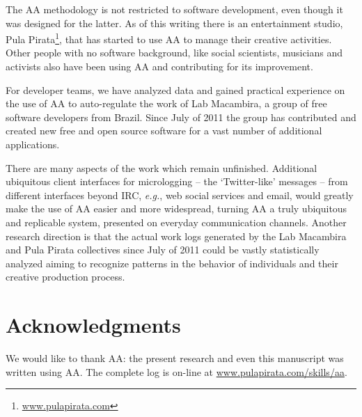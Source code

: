 \documentclass{article}
\newcommand{\eg}{{\it e.g.}}
\begin{document}
The AA methodology is not restricted to software development, even though it was
designed for the latter. As of this
writing there is an entertainment studio, Pula Pirata\footnote{
\url{www.pulapirata.com}}, that has started to use AA to manage their creative activities.
Other people with no software background, like social scientists, musicians and
activists also have been using AA and contributing for its improvement.

For developer teams, we have analyzed data and gained practical experience on
the use of AA to auto-regulate the work of Lab Macambira, a group of free
software developers from Brazil. Since July of 2011 the group has contributed
and created new free and open source software for a vast number of additional applications.

There are many aspects of the work which remain unfinished. Additional
ubiquitous client
interfaces for micrologging -- the `Twitter-like' messages -- from different
interfaces beyond IRC, \eg, web social services and email, would greatly make the use of
AA easier and more widespread, turning AA a truly ubiquitous and replicable system, presented on everyday
communication channels. Another research direction is that the actual work logs
generated by the Lab Macambira and Pula Pirata collectives since July of 2011
could be vastly statistically analyzed aiming to recognize patterns in the
behavior of individuals and their creative production process.

\section*{Acknowledgments}

We would like to thank AA: the present research and even this
manuscript was written using AA. The complete log is on-line at
\url{www.pulapirata.com/skills/aa}.

\nocite{last2003}
\nocite{german2003}
\nocite{carmel1999}
\nocite{carmel2001}
\nocite{komi2005}
\nocite{battin2001}

%
%


\end{document}
